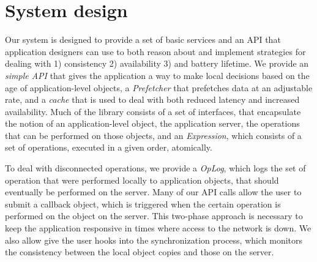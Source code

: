 \section{System design}
Our system is designed to provide a set of basic services and an API that application designers can use to both reason
about and implement strategies for dealing with 1) consistency 2) availability 3) and battery lifetime.  We provide
an \emph{simple API} that gives the application a way to make local decisions based on the age of application-level objects, 
a \emph{Prefetcher} that prefetches data at an adjustable rate, and a \emph{cache} that is used to deal with both reduced latency and 
increased availability.  Much of the library consists of a set of interfaces, that encapsulate the notion of an
application-level object, the application server, the operations that can be performed on those objects, and 
an \emph{Expression}, which consists of a set of operations, executed in a given order, atomically.

To deal with disconnected operations, we provide a \emph{OpLog}, which logs the set of operation that were performed locally to
application objects, that should eventually be performed on the server.  Many of our API calls allow the user to submit a callback
object, which is triggered when the certain operation is performed on the object on the server.  This two-phase approach is necessary to keep
the application responsive in times where access to the network is down.  We also allow give the user hooks into the synchronization
process, which monitors the consistency between the local object copies and those on the server.



